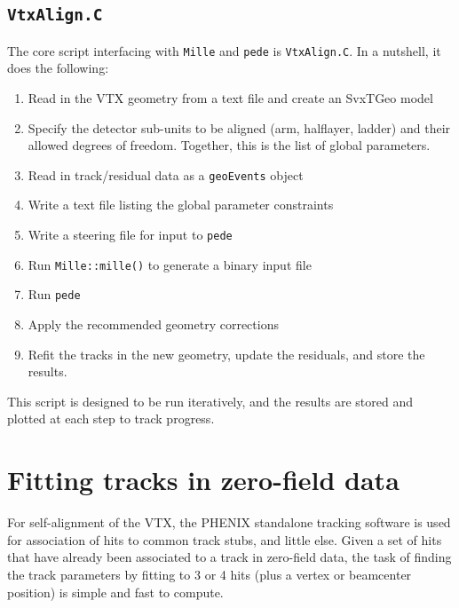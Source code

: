 \documentclass[12pt]{article}
\begin{document}
\subsection{\texttt{VtxAlign.C}}
The core script interfacing with \texttt{Mille} and \texttt{pede} is \texttt{VtxAlign.C}. In a nutshell, it does the following:
\begin{enumerate}
  \item Read in the VTX geometry from a text file and create an SvxTGeo model
  \item Specify the detector sub-units to be aligned (arm, halflayer, ladder) and their allowed degrees of freedom. Together, this is the list of global parameters.
  \item Read in track/residual data as a \texttt{geoEvents} object
  \item Write a text file listing the global parameter constraints
  \item Write a steering file for input to \texttt{pede}
  \item Run \texttt{Mille::mille()} to generate a binary input file
  \item Run \texttt{pede}
  \item Apply the recommended geometry corrections
  \item Refit the tracks in the new geometry, update the residuals, and store the results.
\end{enumerate}
This script is designed to be run iteratively, and the results are stored and plotted at each step to track progress.

\section{Fitting tracks in zero-field data} \label{sec:trackfit}
For self-alignment of the VTX, the PHENIX standalone tracking software is used for association of hits to common track stubs, and little else. Given a set of hits that have already been associated to a track in zero-field data, the task of finding the track parameters by fitting to 3 or 4 hits (plus a vertex or beamcenter position) is simple and fast to compute.
\end{document}
